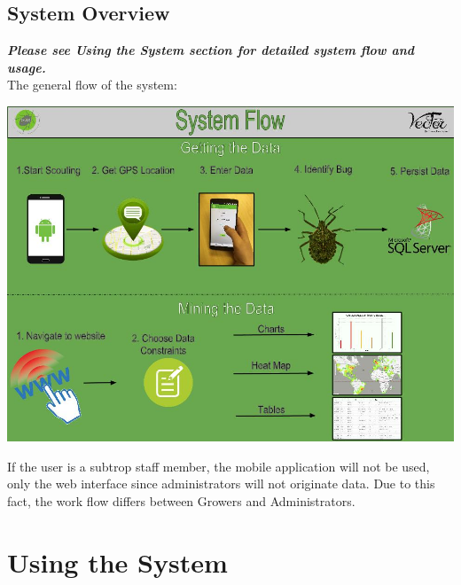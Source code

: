 \documentclass[11pt,a4paper,titlepage]{article}
\begin{document}
\subsection{System Overview}

\textbf{\textit{Please see Using the System section for detailed system flow and usage.}}\\

The general flow of the system:
	\begin{center}
		\includegraphics[width=\linewidth]{SystemFlow.jpg}
	\end{center}

If the user is a subtrop staff member, the mobile application will not be used, only the web interface since administrators will not originate data. Due to this fact, the work flow differs between Growers and Administrators.
\section{Using the System}
\end{document}
